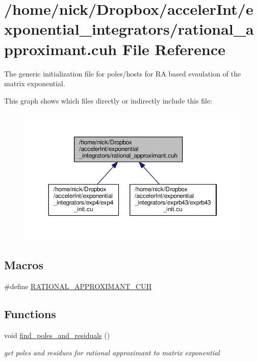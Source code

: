 \hypertarget{rational__approximant_8cuh}{}\section{/home/nick/\+Dropbox/acceler\+Int/exponential\+\_\+integrators/rational\+\_\+approximant.cuh File Reference}
\label{rational__approximant_8cuh}


The generic initialization file for poles/hosts for RA based evaulation of the matrix exponential.  


This graph shows which files directly or indirectly include this file\+:
\nopagebreak
\begin{figure}[H]
\begin{center}
\leavevmode
\includegraphics[width=350pt]{rational__approximant_8cuh__dep__incl}
\end{center}
\end{figure}
\subsection*{Macros}
\begin{DoxyCompactItemize}
\item 
\#define \hyperlink{rational__approximant_8cuh_a49e3ef1a16cc7452a190cbf970b398ec}{R\+A\+T\+I\+O\+N\+A\+L\+\_\+\+A\+P\+P\+R\+O\+X\+I\+M\+A\+N\+T\+\_\+\+C\+UH}
\end{DoxyCompactItemize}
\subsection*{Functions}
\begin{DoxyCompactItemize}
\item 
void \hyperlink{rational__approximant_8cuh_a1cb9bed79a1ce457c891851da0cec0ba}{find\+\_\+poles\+\_\+and\+\_\+residuals} ()
\begin{DoxyCompactList}\small\item\em get poles and residues for rational approximant to matrix exponential \end{DoxyCompactList}\end{DoxyCompactItemize}


